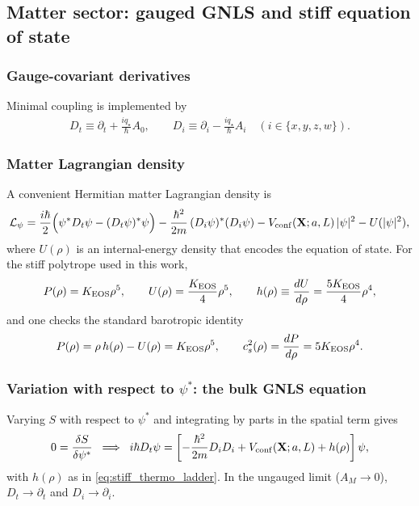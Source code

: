 \documentclass[11pt]{article}
\newcommand{\qstar}{q_\star}
\begin{document}
\subsection{Matter sector: gauged GNLS and stiff equation of state}
\subsubsection{Gauge-covariant derivatives}
Minimal coupling is implemented by
\begin{align}
D_t \equiv \partial_t + \frac{i \qstar}{\hbar}A_0, \qquad
D_i \equiv \partial_i - \frac{i \qstar}{\hbar}A_i \quad (i\in\{x,y,z,w\}).
\label{eq:cov_derivs}
\end{align}

\subsubsection{Matter Lagrangian density}
A convenient Hermitian matter Lagrangian density is
\begin{align}
\mathcal{L}_\psi
=
\frac{i\hbar}{2}\Big(\psi^\ast D_t\psi - (D_t\psi)^\ast\psi\Big)
-\frac{\hbar^2}{2m}\,(D_i\psi)^\ast (D_i\psi)
- V_{\rm conf}(\mathbf{X};a,L)\,|\psi|^2
- U(|\psi|^2),
\label{eq:Lpsi}
\end{align}
where $U(\rho)$ is an internal-energy density that encodes the equation of state.
For the stiff polytrope used in this work,
\begin{align}
P(\rho) = K_{\rm EOS}\rho^5,
\qquad
U(\rho)=\frac{K_{\rm EOS}}{4}\rho^5,
\qquad
h(\rho)\equiv \frac{dU}{d\rho}=\frac{5K_{\rm EOS}}{4}\rho^4,
\label{eq:stiff_thermo_ladder}
\end{align}
and one checks the standard barotropic identity
\begin{align}
P(\rho)=\rho\,h(\rho)-U(\rho)=K_{\rm EOS}\rho^5,
\qquad
c_s^2(\rho)=\frac{dP}{d\rho}=5K_{\rm EOS}\rho^4.
\end{align}

\subsubsection{Variation with respect to \texorpdfstring{$\psi^\ast$}{psi\string^*}: the bulk GNLS equation}
Varying $S$ with respect to $\psi^\ast$ and integrating by parts in the spatial
term gives
\begin{align}
0=\frac{\delta S}{\delta \psi^\ast}
\;\;\Longrightarrow\;\;
i\hbar D_t\psi
=
\left[
-\frac{\hbar^2}{2m}D_iD_i
+V_{\rm conf}(\mathbf{X};a,L)
+h(\rho)
\right]\psi,
\label{eq:gnls_gauged}
\end{align}
with $h(\rho)$ as in \eqref{eq:stiff_thermo_ladder}.  In the ungauged limit
($A_M\to 0$), $D_t\to\partial_t$ and $D_i\to\partial_i$.
\end{document}
